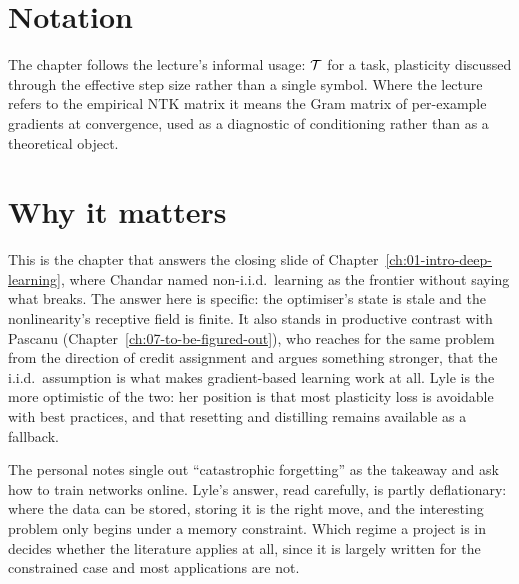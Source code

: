 \section*{Notation}

The chapter follows the lecture's informal usage: $\mathcal{T}$ for a task, plasticity discussed
through the effective step size rather than a single symbol. Where the lecture refers to the
empirical NTK matrix it means the Gram matrix of per-example gradients at convergence, used as
a diagnostic of conditioning rather than as a theoretical object.

\section*{Why it matters}

This is the chapter that answers the closing slide of
Chapter~\ref{ch:01-intro-deep-learning}, where Chandar named non-i.i.d.\ learning as the
frontier without saying what breaks. The answer here is specific: the optimiser's state is
stale and the nonlinearity's receptive field is finite. It also stands in productive contrast
with Pascanu (Chapter~\ref{ch:07-to-be-figured-out}), who reaches for the same problem from
the direction of credit assignment and argues something stronger, that the i.i.d.\ assumption
is what makes gradient-based learning work at all. Lyle is the more optimistic of the two: her
position is that most plasticity loss is avoidable with best practices, and that resetting and
distilling remains available as a fallback.

\begin{aside}
The personal notes single out ``catastrophic forgetting'' as the takeaway and ask how to train
networks online. Lyle's answer, read carefully, is partly deflationary: where the data can be
stored, storing it is the right move, and the interesting problem only begins under a memory
constraint. Which regime a project is in decides whether the literature
applies at all, since it is largely written for the constrained case and most applications are
not.
\end{aside}
